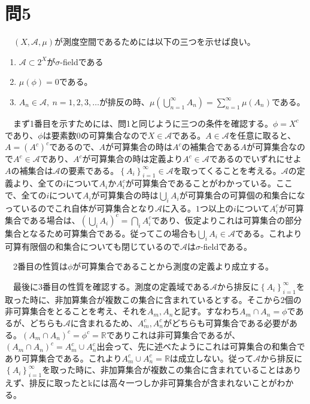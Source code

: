 \documentclass{article}
\begin{document}
\section{問5}
　$\left( X, \mathcal{A}, \mu \right)$が測度空間であるためには以下の三つを示せば良い。
\begin{enumerate}
	\item $\mathcal{A} \subset 2^X$が$\sigma$-fieldである
	\item $\mu(\phi) = 0$である。
	\item $A_n \in \mathcal{A},\ n = 1,2,3,\dots$が排反の時、$\mu\left( \bigcup_{n = 1}^{\infty} A_n \right) = \sum_{n = 1}^{\infty} \mu\left( A_n \right)$である。
\end{enumerate}

　まず1番目を示すためには、問1と同じように三つの条件を確認する。$\phi = X^c$であり、$\phi$は要素数$0$の可算集合なので$X \in \mathcal{A}$である。$A \in \mathcal{A}$を任意に取ると、$A = (A^c)^c$であるので、$A$が可算集合の時は$A^c$の補集合である$A$が可算集合なので$A^c \in \mathcal{A}$であり、$A^c$が可算集合の時は定義より$A^c \in \mathcal{A}$であるのでいずれにせよ$A$の補集合は$\mathcal{A}$の要素である。$\left\{ A_i \right\}_{i = 1}^{\infty} \in \mathcal{A}$を取ってくることを考える。$\mathcal{A}$の定義より、全ての$i$について$A_i$か$A_i^c$が可算集合であることがわかっている。ここで、全ての$i$について$A_i$が可算集合の時は$\bigcup_i A_i$が可算集合の可算個の和集合になっているのでこれ自体が可算集合となり$\mathcal{A}$に入る。$1$つ以上の$i$について$A_i^c$が可算集合である場合は、$\left( \bigcup_i A_i\right)^c = \bigcap_i A_i^c$であり、仮定よりこれは可算集合の部分集合となるため可算集合である。従ってこの場合も$ \bigcup_i A_i \in \mathcal{A}$である。これより可算有限個の和集合についても閉じているので$\mathcal{A}$は$\sigma$-fieldである。

　2番目の性質は$\phi$が可算集合であることから測度の定義より成立する。

　最後に3番目の性質を確認する。測度の定義域である$\mathcal{A}$から排反に$\left\{ A_i \right\}_{i = 1}^{\infty}$を取った時に、非加算集合が複数この集合に含まれているとする。そこから$2$個の非可算集合をとることを考え、それを$A_m, A_n$と記す。すなわち$A_m \cap A_n = \phi$であるが、どちらも$\mathcal{A}$に含まれるため、$A_m^c, A_n^c$がどちらも可算集合である必要がある。$\left( A_m \cap A_n \right)^c = \phi^c = \mathbb{R}$でありこれは非可算集合であるが、$\left( A_m \cap A_n \right)^c = A_m^c \cup A_n^c$出会って、先に述べたようにこれは可算集合の和集合であり可算集合である。これより$A_m^c \cup A_n^c = \mathbb{R}$は成立しない。従って$\mathcal{A}$から排反に$\left\{ A_i \right\}_{i = 1}^{\infty}$を取った時に、非加算集合が複数この集合に含まれていることはありえず、排反に取ったとkには高々一つしか非可算集合が含まれないことがわかる。
\end{document}
